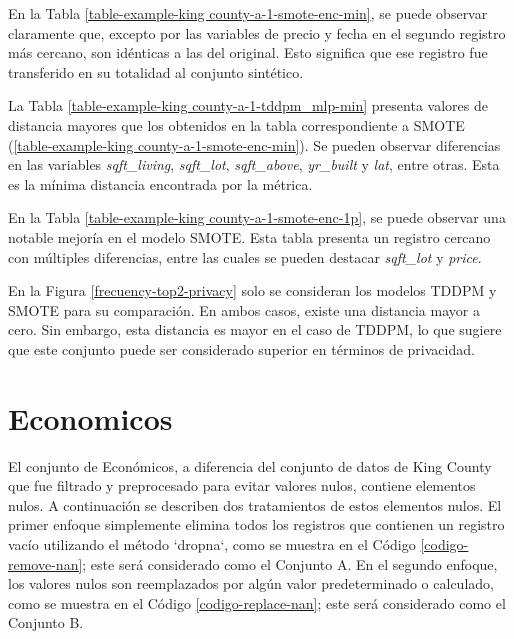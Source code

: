 En la Tabla \ref{table-example-king county-a-1-smote-enc-min}, se puede observar claramente que, excepto por las variables de precio y fecha en el segundo registro más cercano, son idénticas a las del original. Esto significa que ese registro fue transferido en su totalidad al conjunto sintético. 



\newpage
La Tabla \ref{table-example-king county-a-1-tddpm_mlp-min} presenta valores de distancia mayores que los obtenidos en la tabla correspondiente a SMOTE (\ref{table-example-king county-a-1-smote-enc-min}). Se pueden observar diferencias en las variables \emph{sqft\_living}, \emph{sqft\_lot}, \emph{sqft\_above}, \emph{yr\_built} y \emph{lat}, entre otras. Esta es la mínima distancia encontrada por la métrica.

\newpage
En la Tabla \ref{table-example-king county-a-1-smote-enc-1p}, se puede observar una notable mejoría en el modelo SMOTE. Esta tabla presenta un registro cercano con múltiples diferencias, entre las cuales se pueden destacar \emph{sqft\_lot} y \emph{price}.

\newpage
%
%
%


En la Figura \ref{frecuency-top2-privacy} solo se consideran los modelos TDDPM y SMOTE para su comparación. En ambos casos, existe una distancia mayor a cero. Sin embargo, esta distancia es mayor en el caso de TDDPM, lo que sugiere que este conjunto puede ser considerado superior en términos de privacidad.





\newpage
\section{Economicos}
El conjunto de Económicos, a diferencia del conjunto de datos de King County que fue filtrado y preprocesado para evitar valores nulos, contiene elementos nulos. A continuación se describen dos tratamientos de estos elementos nulos. El primer enfoque simplemente elimina todos los registros que contienen un registro vacío utilizando el método `dropna`, como se muestra en el Código \ref{codigo-remove-nan}; este será considerado como el Conjunto A. En el segundo enfoque, los valores nulos son reemplazados por algún valor predeterminado o calculado, como se muestra en el Código \ref{codigo-replace-nan}; este será considerado como el Conjunto B.

